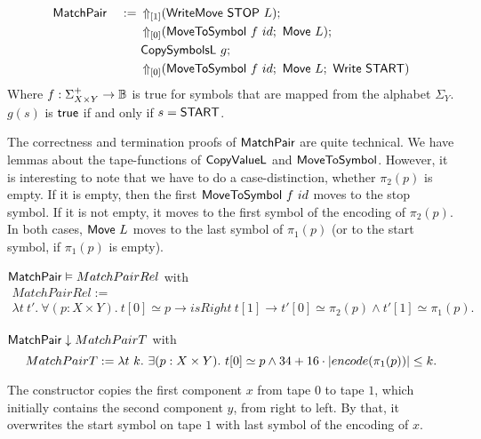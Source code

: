 \begin{definition}[$\MS{MatchPair}$]
  \label{def:MatchPair}
  ~
  \begin{alignat*}{2}
    &\MS{MatchPair}&~:=~& \LiftTapes{(\MS{WriteMove}~\MS{STOP}~L)}{\Vector{1}} \Seq \\
    &              &    & \LiftTapes{(\MS{MoveToSymbol}~f~id \Seq \MS{Move}~L)}{\Vector{0}} \Seq \\
    &              &    & \MS{CopySymbolsL}~g\Seq \\
    &              &    & \LiftTapes{(\MS{MoveToSymbol}~f~id \Seq \MS{Move}~L \Seq \MS{Write}~\MS{START})}{\Vector{0}}
  \end{alignat*}
  Where $f : \Sigma_{X \times Y}^+ \to \Bool$ is true for symbols that are mapped from the alphabet $\Sigma_Y$.  $g(s)$ is $\true$ if and only if
  $s=\MS{START}$.
\end{definition}

The correctness and termination proofs of $\MS{MatchPair}$ are quite technical.  We have lemmas about the tape-functions of $\MS{CopyValueL}$ and
$\MS{MoveToSymbol}$.  However, it is interesting to note that we have to do a case-distinction, whether $\pi_2(p)$ is empty.  If it is empty, then the
first $\MS{MoveToSymbol}~f~id$ moves to the stop symbol.  If it is not empty, it moves to the first symbol of the encoding of $\pi_2(p)$.  In both
cases, $\MS{Move}~L$ moves to the last symbol of $\pi_1(p)$ (or to the start symbol, if $\pi_1(p)$ is empty).

\begin{lemma}
  \label{lem:MatchPair_Realise}
  $\MS{MatchPair} \Realise MatchPairRel$ with
  \begin{multline*}
    MatchPairRel := \\
    \lambda t~t'.~\forall (p: X \times Y).~t[0] \simeq p \rightarrow isRight~t[1] \rightarrow t'[0] \simeq \pi_2(p) \land t'[1] \simeq \pi_1(p).
  \end{multline*}
\end{lemma}
\begin{lemma}
  \label{lem:MatchPair_TerminatesIn}
  $\MS{MatchPair} \TerminatesIn MatchPairT$ with
  \[
    MatchPairT := \lambda t~k.~\exists (p: X \times Y).~t[0] \simeq p \land 34 + 16 \cdot \size{\pi_1(p)} \leq k.
  \]
\end{lemma}

The constructor copies the first component $x$ from tape $0$ to tape $1$, which initially contains the second component $y$, from right to left.  By
that, it overwrites the start symbol on tape $1$ with last symbol of the encoding of $x$.

